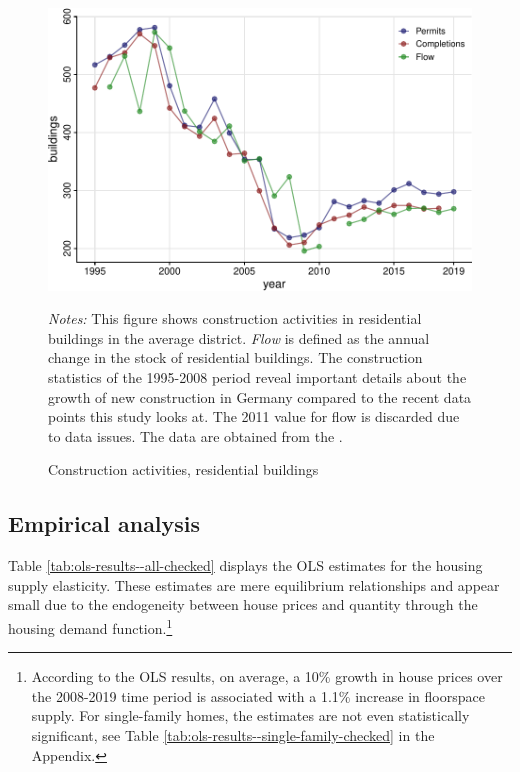 \documentclass[
  12pt,
]{article}
\begin{document}
\begin{figure}[H]
\centering

\begin{center}\includegraphics{output/figs/construction-activities-1} \end{center}

\caption{Construction activities, residential buildings}\label{fig:construction-activities}
\medskip
\begin{minipage}{0.9\textwidth}
\footnotesize
\textit{Notes:} This figure shows construction activities in residential buildings in the average district. \textit{Flow} is defined as the annual change in the stock of residential buildings. The construction statistics of the 1995-2008 period reveal important details about the growth of new construction in Germany compared to the recent data points this study looks at. The 2011 value for flow is discarded due to data issues. The data are obtained from the \citet{atlasde2022}.
\end{minipage}
\end{figure}

\subsection{Empirical analysis}\label{empirical-analysis}

Table \ref{tab:ols-results--all-checked} displays the OLS estimates for the housing supply elasticity. These estimates are mere equilibrium relationships and appear small due to the endogeneity between house prices and quantity through the housing demand function.\footnote{According to the OLS results, on average, a 10\% growth in house prices over the 2008-2019 time period is associated with a 1.1\% increase in floorspace supply. For single-family homes, the estimates are not even statistically significant, see Table \ref{tab:ols-results--single-family-checked} in the Appendix.}
\end{document}
